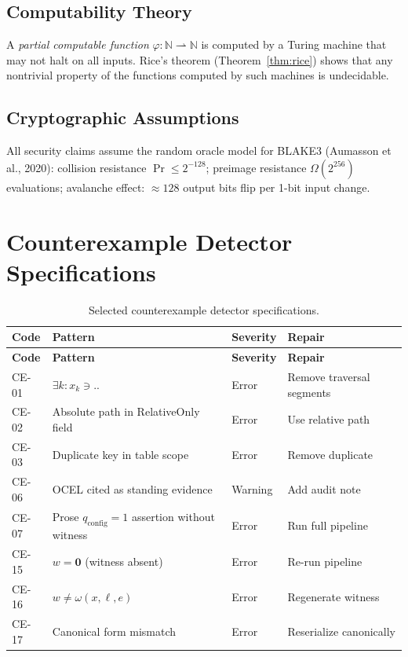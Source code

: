 \documentclass[12pt, letterpaper]{report}
\theoremstyle{plain}
\theoremstyle{definition}
\theoremstyle{remark}
\newcommand{\N}{\mathbb{N}}
\newcommand{\qc}{q_{\mathrm{config}}}
\begin{document}
\section{Computability Theory}
A \emph{partial computable function} $\varphi : \N \rightharpoonup \N$
is computed by a Turing machine that may not halt on all inputs.
Rice's theorem (Theorem~\ref{thm:rice}) shows that any nontrivial property
of the functions computed by such machines is undecidable.

\section{Cryptographic Assumptions}
All security claims assume the random oracle model for BLAKE3
(Aumasson et al., 2020):
collision resistance $\Pr \leq 2^{-128}$;
preimage resistance $\Omega(2^{256})$ evaluations;
avalanche effect: $\approx 128$ output bits flip per 1-bit input change.

\chapter{Counterexample Detector Specifications}
\label{app:detectors}

\begin{longtable}{@{}lp{3.5cm}lp{5cm}@{}}
\caption{Selected counterexample detector specifications.} \\
\toprule
\textbf{Code} & \textbf{Pattern} & \textbf{Severity} & \textbf{Repair} \\
\midrule
\endfirsthead
\toprule \textbf{Code} & \textbf{Pattern} & \textbf{Severity} & \textbf{Repair} \\
\midrule
\endhead
CE-01 & $\exists k: x_k \ni \texttt{..}$ & Error & Remove traversal segments \\
CE-02 & Absolute path in RelativeOnly field & Error & Use relative path \\
CE-03 & Duplicate key in table scope & Error & Remove duplicate \\
CE-06 & OCEL cited as standing evidence & Warning & Add audit note \\
CE-07 & Prose $\qc=1$ assertion without witness & Error & Run full pipeline \\
CE-15 & $w = \bm{0}$ (witness absent) & Error & Re-run pipeline \\
CE-16 & $w \neq \omega(x,\ell,e)$ & Error & Regenerate witness \\
CE-17 & Canonical form mismatch & Error & Reserialize canonically \\
\bottomrule
\end{longtable}
\end{document}
